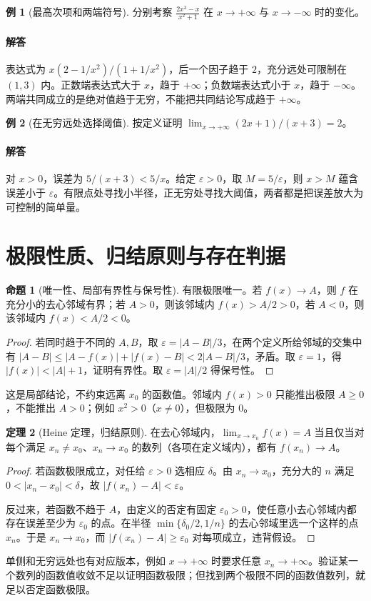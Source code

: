 \documentclass[UTF8,fontset=fandol,12pt,oneside,openany]{ctexrep}
\theoremstyle{definition}
\newtheorem{theorem}{定理}[chapter]
\newtheorem{proposition}[theorem]{命题}
\newtheorem{example}{例}[chapter]
\begin{document}
\begin{example}[最高次项和两端符号]
分别考察 $\displaystyle\frac{2x^3-x}{x^2+1}$ 在 $x\to+\infty$ 与 $x\to-\infty$ 时的变化。
\end{example}
\paragraph{解答}表达式为 $x(2-1/x^2)/(1+1/x^2)$，后一个因子趋于 $2$，充分远处可限制在 $(1,3)$ 内。正数端表达式大于 $x$，趋于 $+\infty$；负数端表达式小于 $x$，趋于 $-\infty$。两端共同成立的是绝对值趋于无穷，不能把共同结论写成趋于 $+\infty$。

\begin{example}[在无穷远处选择阈值]
按定义证明 $\lim_{x\to+\infty}(2x+1)/(x+3)=2$。
\end{example}
\paragraph{解答}对 $x>0$，误差为 $5/(x+3)<5/x$。给定 $\varepsilon>0$，取 $M=5/\varepsilon$，则 $x>M$ 蕴含误差小于 $\varepsilon$。有限点处寻找小半径，正无穷处寻找大阈值，两者都是把误差放大为可控制的简单量。

\section{极限性质、归结原则与存在判据}
\label{lec:03:criteria}
\begin{proposition}[唯一性、局部有界性与保号性]
有限极限唯一。若 $f(x)\to A$，则 $f$ 在充分小的去心邻域有界；若 $A>0$，则该邻域内 $f(x)>A/2>0$，若 $A<0$，则该邻域内 $f(x)<A/2<0$。
\end{proposition}
\begin{proof}
若同时趋于不同的 $A,B$，取 $\varepsilon=|A-B|/3$，在两个定义所给邻域的交集中有
$|A-B|\le|A-f(x)|+|f(x)-B|<2|A-B|/3$，矛盾。取 $\varepsilon=1$，得 $|f(x)|<|A|+1$，证明有界性。取 $\varepsilon=|A|/2$ 得保号性。
\end{proof}
这是局部结论，不约束远离 $x_0$ 的函数值。邻域内 $f(x)>0$ 只能推出极限 $A\ge0$，不能推出 $A>0$；例如 $x^2>0$（$x\ne0$），但极限为 $0$。

\begin{theorem}[Heine 定理，归结原则]
在去心邻域内，$\lim_{x\to x_0}f(x)=A$ 当且仅当对每个满足 $x_n\ne x_0$、$x_n\to x_0$ 的数列（各项在定义域内），都有 $f(x_n)\to A$。
\end{theorem}
\begin{proof}
若函数极限成立，对任给 $\varepsilon>0$ 选相应 $\delta$。由 $x_n\to x_0$，充分大的 $n$ 满足 $0<|x_n-x_0|<\delta$，故 $|f(x_n)-A|<\varepsilon$。

反过来，若函数不趋于 $A$，由定义的否定有固定 $\varepsilon_0>0$，使任意小去心邻域内都存在误差至少为 $\varepsilon_0$ 的点。在半径 $\min\{\delta_0/2,1/n\}$ 的去心邻域里选一个这样的点 $x_n$。于是 $x_n\to x_0$，而 $|f(x_n)-A|\ge\varepsilon_0$ 对每项成立，违背假设。
\end{proof}
单侧和无穷远处也有对应版本，例如 $x\to+\infty$ 时要求任意 $x_n\to+\infty$。验证某一个数列的函数值收敛不足以证明函数极限；但找到两个极限不同的函数值数列，就足以否定函数极限。
\end{document}
